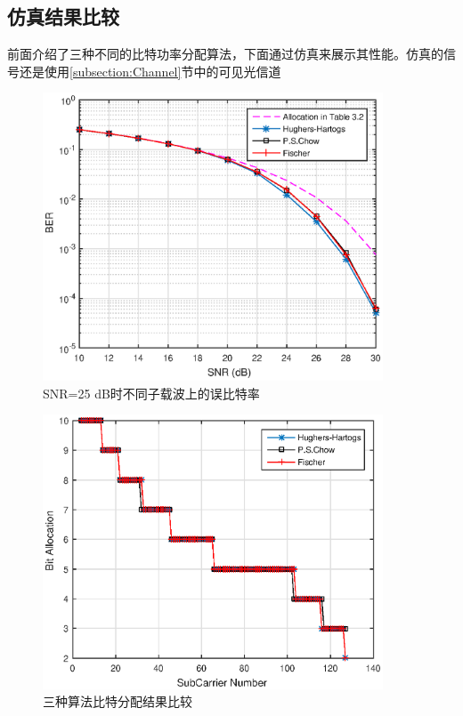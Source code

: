 \subsection{仿真结果比较}
前面介绍了三种不同的比特功率分配算法，下面通过仿真来展示其性能。仿真的信号还是使用\ref{subsection:Channel}节中的可见光信道
\begin{figure}[htbp]
\centering
\includegraphics[width=0.9\textwidth]{figures/chapter-4/BERonDiffAlgo.eps}
\caption{SNR=25 dB时不同子载波上的误比特率}
\label{fig:berOnDiffAlgo}
\end{figure}

\begin{figure}[htbp]
\centering
\includegraphics[width=0.9\textwidth]{figures/chapter-4/loadedBit.eps}
\caption{三种算法比特分配结果比较}
\label{fig:loadedBit}
\end{figure}

